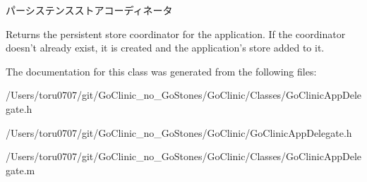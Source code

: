 パーシステンスストアコーディネータ 

Returns the persistent store coordinator for the application. If the coordinator doesn't already exist, it is created and the application's store added to it. 

The documentation for this class was generated from the following files:\begin{DoxyCompactItemize}
\item 
/Users/toru0707/git/GoClinic\_\-no\_\-GoStones/GoClinic/Classes/GoClinicAppDelegate.h\item 
/Users/toru0707/git/GoClinic\_\-no\_\-GoStones/GoClinic/GoClinicAppDelegate.h\item 
/Users/toru0707/git/GoClinic\_\-no\_\-GoStones/GoClinic/Classes/GoClinicAppDelegate.m\end{DoxyCompactItemize}
